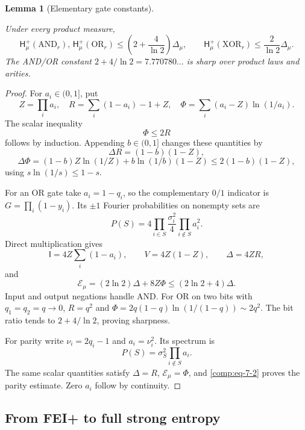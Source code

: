 \documentclass[11pt]{amsart}
\newtheorem{lemma}[theorem]{Lemma}
\theoremstyle{definition}
\theoremstyle{remark}
\newcommand{\HH}{\mathsf H}
\newcommand{\I}{\mathsf I}
\begin{document}
\begin{lemma}[Elementary gate constants]\label{comp:elementary-gates}

Under every product measure, \begin{equation}\label{comp:eq-7-1}
\HH_\mu^+(\mathrm{AND}_r),\,\HH_\mu^+(\mathrm{OR}_r)
       \le\left(2+\frac4{\ln2}\right)\Delta_\mu,
 \qquad
 \HH_\mu^+(\mathrm{XOR}_r)\le\frac2{\ln2}\Delta_\mu.
\end{equation} The AND/OR constant \(2+4/\ln2=7.770780\ldots\) is sharp over product laws and arities.

\end{lemma}
\begin{proof}

For \(a_i\in(0,1]\), put \[
 Z=\prod_i a_i,\quad
 R=\sum_i(1-a_i)-1+Z,\quad
 \Phi=\sum_i(a_i-Z)\ln(1/a_i).
\] The scalar inequality \begin{equation}\label{comp:eq-7-2}
\Phi\le2R
\end{equation} follows by induction. Appending \(b\in(0,1]\) changes these quantities by \[
 \Delta R=(1-b)(1-Z),
\] \[
 \Delta\Phi=(1-b)Z\ln(1/Z)+b\ln(1/b)(1-Z)
            \le2(1-b)(1-Z),
\] using \(s\ln(1/s)\le1-s\).

For an OR gate take \(a_i=1-q_i\), so the complementary \(0/1\) indicator is \(G=\prod_i(1-y_i)\). Its \(\pm1\) Fourier probabilities on nonempty sets are \[
 P(S)=4\prod_{i\in S}\frac{\sigma_i^2}{4}
              \prod_{i\notin S}a_i^2.
\] Direct multiplication gives \[
 \I=4Z\sum_i(1-a_i),\qquad V=4Z(1-Z),\qquad \Delta=4ZR,
\] and \[
 \mathcal E_\mu=(2\ln2)\Delta+8Z\Phi
        \le(2\ln2+4)\Delta.
\] Input and output negations handle AND. For OR on two bits with \(q_1=q_2=q\to0\), \(R=q^2\) and \(\Phi=2q(1-q)\ln(1/(1-q))\sim2q^2\). The bit ratio tends to \(2+4/\ln2\), proving sharpness.

For parity write \(\nu_i=2q_i-1\) and \(a_i=\nu_i^2\). Its spectrum is \[
 P(S)=\sigma_S^2\prod_{i\notin S}a_i.
\] The same scalar quantities satisfy \(\Delta=R\), \(\mathcal E_\mu=\Phi\), and \eqref{comp:eq-7-2} proves the parity estimate. Zero \(a_i\) follow by continuity.

\end{proof}

\subsection{From FEI+ to full strong entropy}\label{comp:conversion-section}
\end{document}
